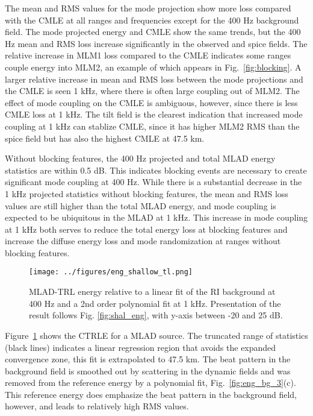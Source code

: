 \documentclass[preprint,NumberedRefs]{JASA}
\begin{document}
The mean and RMS values for the mode projection show more loss compared with the CMLE at all ranges and frequencies except for the 400 Hz background field. The mode projected energy and CMLE show the same trends, but the 400 Hz mean and RMS loss increase significantly in the observed and spice fields. The relative increase in MLM1 loss compared to the CMLE indicates some ranges couple energy into MLM2, an example of which appears in Fig.~\ref{fig:blocking}. A larger relative increase in mean and RMS loss between the mode projections and the CMLE is seen 1 kHz, where there is often large coupling out of MLM2. The effect of mode coupling on the CMLE is ambiguous, however, since there is less CMLE loss at 1 kHz. The tilt field is the clearest indication that increased mode coupling at 1 kHz can stablize CMLE, since it has higher MLM2 RMS than the spice field but has also the highest CMLE at 47.5 km.

Without blocking features, the 400 Hz projected and total MLAD energy statistics are within 0.5 dB. This indicates blocking events are necessary to create significant mode coupling at 400 Hz. While there is a substantial decrease in the 1 kHz projected statistics without blocking features, the mean and RMS loss values are still higher than the total MLAD energy, and mode coupling is expected to be ubiquitous in the MLAD at 1 kHz. This increase in mode coupling at 1 kHz both serves to reduce the total energy loss at blocking features and increase the diffuse energy loss and mode randomization at ranges without blocking features.

\begin{figure}
\texttt{[image: ../figures/eng\_shallow\_tl.png]}
        \caption{MLAD-TRL energy relative to a linear fit of the RI background at 400 Hz and a 2nd order polynomial fit at 1 kHz. Presentation of the result follows Fig. \ref{fig:shal_eng}, with y-axis between -20 and 25 dB.}
    \label{fig:eng_tl}
\end{figure}
Figure~\ref{fig:eng_tl} shows the CTRLE for a MLAD source. The truncated range of statistics (black lines) indicates a linear regression region that avoids the expanded convergence zone, this fit is extrapolated to 47.5 km. The beat pattern in the background field is smoothed out by scattering in the dynamic fields and was removed from the reference energy by a polynomial fit, Fig.~\ref{fig:eng_bg_3}(c). This reference energy does emphasize the beat pattern in the background field, however, and leads to relatively high RMS values.
\end{document}
